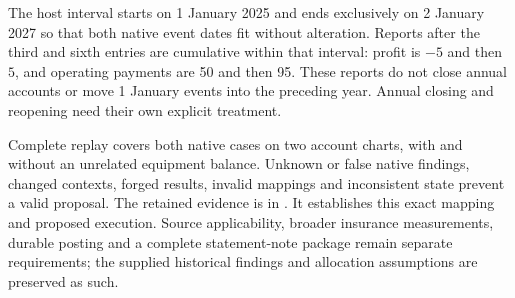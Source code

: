 The host interval starts on 1 January 2025 and ends exclusively on
2 January 2027 so that both native event dates fit without alteration. Reports
after the third and sixth entries are cumulative within that interval: profit
is $-5$ and then $5$, and operating payments are 50 and then 95. These reports
do not close annual accounts or move 1 January events into the preceding year.
Annual closing and reopening need their own explicit treatment.

Complete replay covers both native cases on two account charts, with and
without an unrelated equipment balance. Unknown or false native findings,
changed contexts, forged results, invalid mappings and inconsistent state
prevent a valid proposal. The retained evidence is in
.
It establishes this exact mapping and proposed execution. Source applicability,
broader insurance measurements, durable posting and a complete statement-note
package remain separate requirements; the supplied historical findings and
allocation assumptions are preserved as such.
